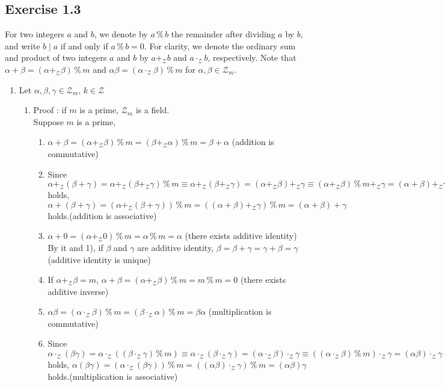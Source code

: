 \documentclass{article}
\theoremstyle{thmstyleone}
\theoremstyle{thmstyletwo}
\theoremstyle{thmstylethree}
\newcommand\Z{\mathcal Z}
\begin{document}
\subsection{Exercise 1.3}
\newcommand\rem{\mathbin\%} %
\newcommand\Zm{\mathcal Z_m} %
For two integers $a$ and $b$,
we denote by $a \rem b$ the remainder after dividing $a$ by $b$,
and write $b \mid a$ if and only if $a \rem b = 0$.
For clarity,
we denote the ordinary sum and product of two integers $a$ and $b$
by $a +_\Z b$ and $a \cdot_\Z b$, respectively.
Note that $\alpha + \beta = (\alpha +_\Z \beta) \rem m$
and $\alpha\beta = (\alpha \cdot_\Z \beta) \rem m$
for $\alpha, \beta \in \Zm$.
\begin{enumerate}[label=(\alph*)]
  \item  Let $\alpha,\beta,\gamma \in \Zm$, $k \in \Z$
    \begin{enumerate}[label = \arabic*']
      \item\label{it:ex1.3.a.r} Proof : if $m$ is a prime, $\Zm$ is a field.\\
        Suppose $m$ is a prime,
        \begin{enumerate}[label=\arabic*)]
          \item\label{it:ex1.3.a.r.A1} $\alpha + \beta = (\alpha +_\Z \beta) \rem m = (\beta +_\Z \alpha) \rem m = \beta + \alpha$ (addition is commutative)
          \item  Since $\alpha +_\Z (\beta + \gamma) = \alpha +_\Z (\beta +_\Z \gamma) \rem m \equiv \alpha +_\Z (\beta +_\Z \gamma) = (\alpha +_\Z \beta) +_\Z \gamma \equiv (\alpha +_\Z \beta) \rem m +_\Z \gamma = (\alpha + \beta) +_\Z \gamma \pmod m$ holds, $\alpha + (\beta + \gamma) = (\alpha +_\Z (\beta + \gamma)) \rem m  = ((\alpha + \beta) +_\Z \gamma) \rem m = (\alpha + \beta) + \gamma $ holds.(addition is associative)
          \item  $\alpha + 0 = (\alpha +_\Z 0) \rem m = \alpha \rem m = \alpha$ (there exists additive identity)  By it and 1), if $\beta$ and $\gamma$ are additive identity, $\beta = \beta + \gamma = \gamma + \beta = \gamma$ (additive identity is unique)
          \item  If $\alpha + _\Z\beta = m$, $\alpha + \beta = (\alpha + _\Z\beta) \rem m = m \rem m = 0$ (there exists additive inverse)
          \item  $\alpha\beta = (\alpha \cdot_\Z \beta) \rem m = (\beta \cdot_\Z \alpha) \rem m = \beta\alpha$ (multiplication is commutative)
          \item  Since $\alpha \cdot_\Z (\beta\gamma) = \alpha \cdot_\Z ((\beta \cdot_\Z \gamma) \rem m) \equiv \alpha \cdot_\Z (\beta \cdot_\Z \gamma) = (\alpha \cdot_\Z \beta) \cdot_\Z \gamma \equiv ((\alpha \cdot_\Z \beta) \rem m) \cdot_\Z \gamma = (\alpha\beta) \cdot_\Z \gamma \pmod m$ holds, $\alpha(\beta\gamma) = (\alpha \cdot_\Z (\beta\gamma)) \rem m = ((\alpha\beta)\cdot_\Z \gamma) \rem m = (\alpha\beta)\gamma$ holds.(multiplication is associative)

\end{enumerate}
\end{enumerate}
\end{enumerate}
\end{document}
